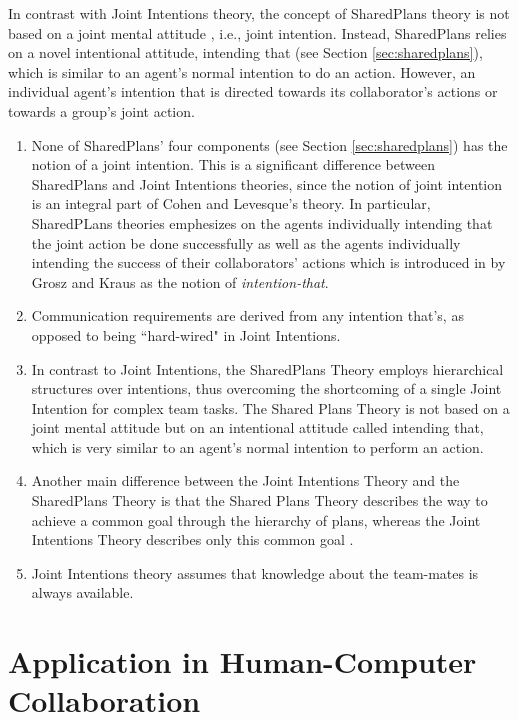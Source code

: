\documentclass[11pt]{article}
\begin{document}
In contrast with Joint Intentions theory, the concept of SharedPlans theory is
not based on a joint mental attitude , i.e., joint intention. Instead,
SharedPlans relies on a novel intentional attitude, intending that (see
Section \ref{sec:sharedplans}), which is similar to an agent's normal intention
to do an action. However, an individual agent's intention that is directed
towards its collaborator's actions or towards a group's joint action.

\begin{enumerate}
  \item None of SharedPlans' four components (see Section \ref{sec:sharedplans})
  has the notion of a joint intention. This is a significant difference between
  SharedPlans and Joint Intentions theories, since the notion of joint intention
  is an integral part of Cohen and Levesque's theory. In particular, SharedPLans
  theories emphesizes on the agents individually intending that the joint action
  be done successfully as well as the agents individually intending the success
  of their collaborators' actions which is introduced in
  \cite{grosz:collaboration} by Grosz and Kraus as the notion of
  \textit{intention-that}.
  \item Communication requirements are derived from any intention that's, as
  opposed to being ``hard-wired" in Joint Intentions.
  \item In contrast to Joint Intentions, the SharedPlans Theory employs
  hierarchical structures over intentions, thus overcoming the shortcoming of a
  single Joint Intention for complex team tasks. The Shared Plans Theory is not
  based on a joint mental attitude but on an intentional attitude called
  intending that, which is very similar to an agent’s normal intention to
  perform an action.
  \item Another main difference between the Joint Intentions Theory and the
  SharedPlans Theory is that the Shared Plans Theory describes the way to
  achieve a common goal through the hierarchy of plans, whereas the Joint
  Intentions Theory describes only this common goal
  \cite{skubch:modelling-behavior-robots}.
  \item Joint Intentions theory assumes that knowledge about the team-mates is
  always available.
\end{enumerate}

\section{Application in Human-Computer Collaboration}
\label{sec:applicaiton}
\end{document}

